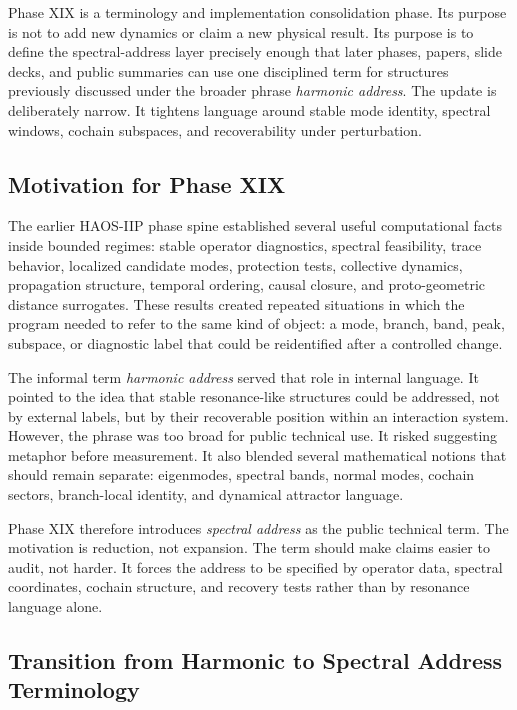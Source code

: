 \documentclass[11pt]{article}
\begin{document}
Phase XIX is a terminology and implementation consolidation phase. Its purpose is not to add new dynamics or claim a new physical result. Its purpose is to define the spectral-address layer precisely enough that later phases, papers, slide decks, and public summaries can use one disciplined term for structures previously discussed under the broader phrase \emph{harmonic address}. The update is deliberately narrow. It tightens language around stable mode identity, spectral windows, cochain subspaces, and recoverability under perturbation.

\subsection{Motivation for Phase XIX}

The earlier HAOS-IIP phase spine established several useful computational facts inside bounded regimes: stable operator diagnostics, spectral feasibility, trace behavior, localized candidate modes, protection tests, collective dynamics, propagation structure, temporal ordering, causal closure, and proto-geometric distance surrogates. These results created repeated situations in which the program needed to refer to the same kind of object: a mode, branch, band, peak, subspace, or diagnostic label that could be reidentified after a controlled change.

The informal term \emph{harmonic address} served that role in internal language. It pointed to the idea that stable resonance-like structures could be addressed, not by external labels, but by their recoverable position within an interaction system. However, the phrase was too broad for public technical use. It risked suggesting metaphor before measurement. It also blended several mathematical notions that should remain separate: eigenmodes, spectral bands, normal modes, cochain sectors, branch-local identity, and dynamical attractor language.

Phase XIX therefore introduces \emph{spectral address} as the public technical term. The motivation is reduction, not expansion. The term should make claims easier to audit, not harder. It forces the address to be specified by operator data, spectral coordinates, cochain structure, and recovery tests rather than by resonance language alone.

\subsection{Transition from Harmonic to Spectral Address Terminology}
\end{document}
